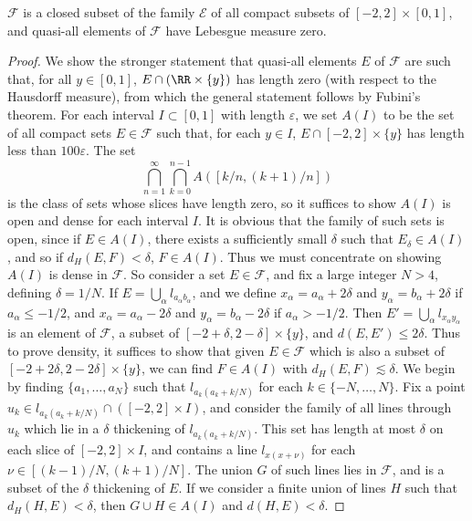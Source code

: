 \begin{theorem}
	$\mathcal{F}$ is a closed subset of the family $\mathcal{E}$ of all compact subsets of $[-2,2] \times [0,1]$, and quasi-all elements of $\mathcal{F}$ have Lebesgue measure zero.
\end{theorem}
\begin{proof}
	We show the stronger statement that quasi-all elements $E$ of $\mathcal{F}$ are such that, for all $y \in [0,1]$, $E \cap (\RR \times \{ y \})$ has length zero (with respect to the Hausdorff measure), from which the general statement follows by Fubini's theorem. For each interval $I \subset [0,1]$ with length $\varepsilon$, we set $A(I)$ to be the set of all compact sets $E \in \mathcal{F}$ such that, for each $y \in I$, $E \cap [-2,2] \times \{ y \}$ has length less than $100 \varepsilon$. The set
	\[ \bigcap_{n = 1}^\infty \bigcap_{k = 0}^{n-1} A([k/n,(k+1)/n]) \]
	is the class of sets whose slices have length zero, so it suffices to show $A(I)$ is open and dense for each interval $I$. It is obvious that the family of such sets is open, since if $E \in A(I)$, there exists a sufficiently small $\delta$ such that $E_\delta \in A(I)$, and so if $d_H(E,F) < \delta$, $F \in A(I)$. Thus we must concentrate on showing $A(I)$ is dense in $\mathcal{F}$. So consider a set $E \in \mathcal{F}$, and fix a large integer $N > 4$, defining $\delta = 1/N$. If $E = \bigcup_\alpha l_{a_\alpha b_\alpha}$, and we define $x_\alpha = a_\alpha + 2\delta$ and $y_\alpha = b_\alpha + 2\delta$ if $a_\alpha \leq -1/2$, and $x_\alpha = a_\alpha - 2\delta$ and $y_\alpha = b_\alpha - 2\delta$ if $a_\alpha > -1/2$. Then $E' = \bigcup_\alpha l_{x_\alpha y_\alpha}$ is an element of $\mathcal{F}$, a subset of $[-2+\delta,2-\delta] \times \{ y \}$, and $d(E,E') \leq 2\delta$. Thus to prove density, it suffices to show that given $E \in \mathcal{F}$ which is also a subset of $[-2+2\delta,2-2\delta] \times \{ y \}$, we can find $F \in A(I)$ with $d_H(E,F) \lesssim \delta$. We begin by finding $\{ a_1, \dots, a_N \}$ such that $l_{a_k(a_k + k/N)}$ for each $k \in \{ -N, \dots, N \}$. Fix a point $u_k \in l_{a_k(a_k + k/N)} \cap ([-2,2] \times I)$, and consider the family of all lines through $u_k$ which lie in a $\delta$ thickening of $l_{a_k(a_k + k/N)}$. This set has length at most $\delta$ on each slice of $[-2,2] \times I$, and contains a line $l_{x(x + \nu)}$ for each $\nu \in [(k-1)/N,(k+1)/N]$. The union $G$ of such lines lies in $\mathcal{F}$, and is a subset of the $\delta$ thickening of $E$. If we consider a finite union of lines $H$ such that $d_H(H,E) < \delta$, then $G \cup H \in A(I)$ and $d(H,E) < \delta$.
\end{proof}

